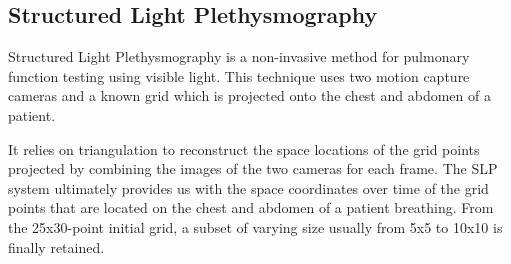 \documentclass[boxedsections ,landscape, a0]{sciposter_v2}
\begin{document}
\begin{multicols}{4}

\section{Structured Light Plethysmography}

Structured Light Plethysmography is a non-invasive method for pulmonary function
testing using visible light. This technique uses two motion capture cameras and a
known grid which is projected onto the chest and abdomen of a patient.


\begin{figure}

\end{figure}


It relies on triangulation to reconstruct the space locations of the grid points projected
by combining the images of the two cameras for each frame. 
The SLP system ultimately provides us with the space coordinates over time of the grid
points that are located on the chest and abdomen of a patient breathing. From the
25x30-point initial grid, a subset of varying size usually from 5x5 to 10x10 is finally
retained.




\end{multicols}
\end{document}
